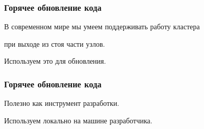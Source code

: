 \documentclass[10pt]{beamer}
\begin{document}
\begin{frame}
  \frametitle{Горячее обновление кода}
  В современном мире мы умеем поддерживать работу кластера
  \par \bigskip
  при выходе из стоя части узлов.
  \par \bigskip
  Используем это для обновления.
\end{frame}

\begin{frame}
  \frametitle{Горячее обновление кода}
  Полезно как инструмент разработки.
  \par \bigskip
  Используем локально на машине разработчика.
\end{frame}




\end{document}
